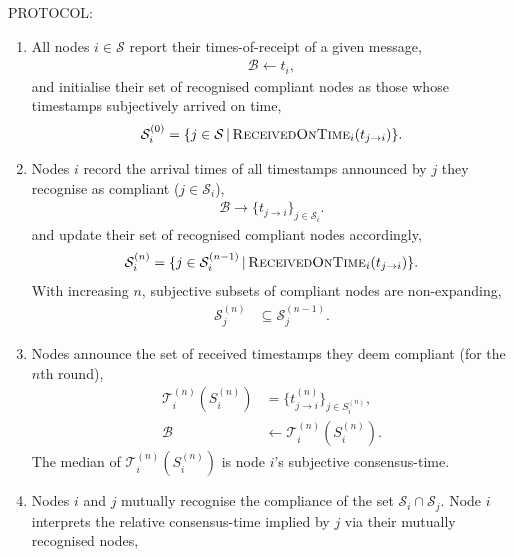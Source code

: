 PROTOCOL:
\begin{enumerate}
	\item All nodes $i\in\mathcal{S}$ report their times-of-receipt of a given message,
	      \begin{align}
		      \mathcal{B} \gets t_i,
	      \end{align}
	      and initialise their set of recognised compliant nodes as those whose timestamps subjectively arrived on time,
	      \begin{align}
		      \mathcal{S}_i^{(0)} = \{j\in\mathcal{S} \,|\, \textsc{ReceivedOnTime}_i(t_{j\to i})\}.
	      \end{align}
	\item Nodes $i$ record the arrival times of all timestamps announced by $j$ they recognise as compliant ($j\in\mathcal{S}_i$),
	      \begin{align}
		      \mathcal{B} \to \{t_{j\to i}\}_{j\in \mathcal{S}_i}.
	      \end{align}
	      and update their set of recognised compliant nodes accordingly,
	      \begin{align}
		      \mathcal{S}_i^{(n)} = \{j\in\mathcal{S}_i^{(n-1)} \,|\, \textsc{ReceivedOnTime}_i(t_{j\to i})\}.
	      \end{align}
	      With increasing $n$, subjective subsets of compliant nodes are non-expanding,
	      \begin{align}
		      \mathcal{S}_j^{(n)} & \subseteq \mathcal{S}_j^{(n-1)}.
	      \end{align}
	\item Nodes announce the set of received timestamps they deem compliant (for the $n$th round),
	      \begin{align}
		      \mathcal{T}_i^{(n)}(S_i^{(n)}) & = \{t_{j\to i}^{(n)}\}_{j\in S_i^{(n)}}, \nonumber \\
		      \mathcal{B}                    & \gets \mathcal{T}_i^{(n)}(S_i^{(n)}).
	      \end{align}
	      The median of $\mathcal{T}_i^{(n)}(S_i^{(n)})$ is node $i$'s subjective consensus-time.
	\item Nodes $i$ and $j$ mutually recognise the compliance of the set $\mathcal{S}_i \cap \mathcal{S}_j$. Node $i$ interprets the relative consensus-time implied by $j$ via their mutually recognised nodes,

\end{enumerate}
